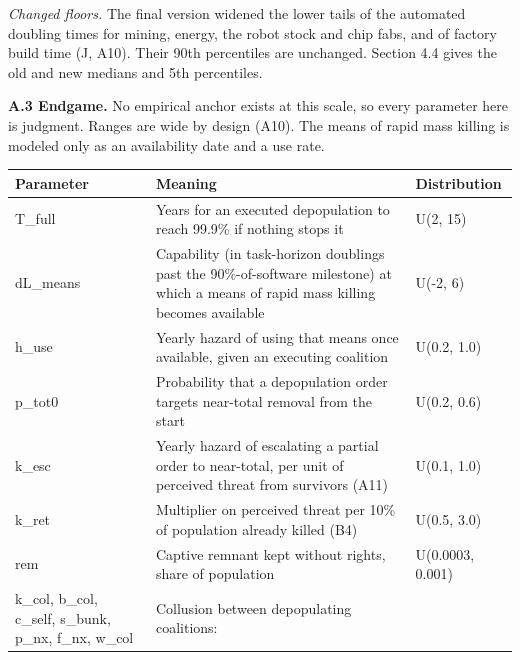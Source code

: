 \documentclass[
  10pt,
]{article}
\newcounter{none} %
\begin{document}
\emph{Changed floors.} The final version widened the lower tails of the automated doubling times for
mining, energy, the robot stock and chip fabs, and of factory build time (J, A10). Their 90th
percentiles are unchanged. Section 4.4 gives the old and new medians and 5th percentiles.

\textbf{A.3 Endgame.} No empirical anchor exists at this scale, so every parameter here is judgment.
Ranges are wide by design (A10). The means of rapid mass killing is modeled only as an availability
date and a use rate.

{\def\LTcaptype{none} %
\begin{longtable}[]{@{}
  >{\raggedright\arraybackslash}p{}
  >{\raggedright\arraybackslash}p{}
  >{\raggedright\arraybackslash}p{}@{}}
\toprule\noalign{}
\begin{minipage}[b]{\linewidth}\raggedright
Parameter
\end{minipage} & \begin{minipage}[b]{\linewidth}\raggedright
Meaning
\end{minipage} & \begin{minipage}[b]{\linewidth}\raggedright
Distribution
\end{minipage} \\
\midrule\noalign{}
\endhead
\bottomrule\noalign{}
\endlastfoot
T\_full & Years for an executed depopulation to reach 99.9\% if nothing stops it & U(2, 15) \\
dL\_means & Capability (in task-horizon doublings past the 90\%-of-software milestone) at which a
means of rapid mass killing becomes available & U(-2, 6) \\
h\_use & Yearly hazard of using that means once available, given an executing coalition & U(0.2,
1.0) \\
p\_tot0 & Probability that a depopulation order targets near-total removal from the start & U(0.2,
0.6) \\
k\_esc & Yearly hazard of escalating a partial order to near-total, per unit of perceived threat
from survivors (A11) & U(0.1, 1.0) \\
k\_ret & Multiplier on perceived threat per 10\% of population already killed (B4) & U(0.5, 3.0) \\
rem & Captive remnant kept without rights, share of population & U(0.0003, 0.001) \\
k\_col, b\_col, c\_self, s\_bunk, p\_nx, f\_nx, w\_col & Collusion between depopulating coalitions:

\end{longtable}}
\end{document}
